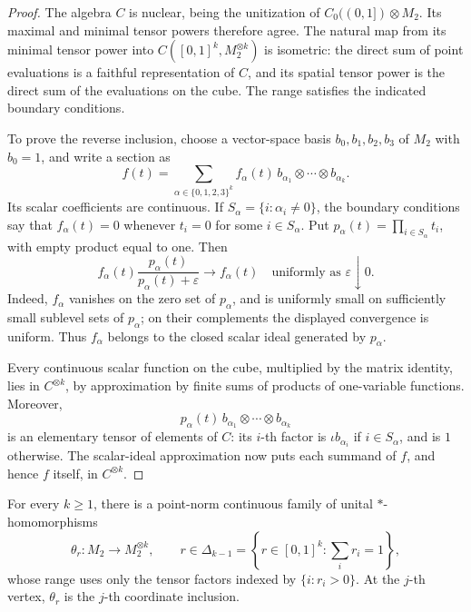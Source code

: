 \begin{proof}
The algebra \(C\) is nuclear, being the unitization of
\(C_0((0,1])\otimes M_2\). Its maximal and minimal tensor powers therefore
agree. The natural map from its minimal tensor power into
\(C([0,1]^k,M_2^{\otimes k})\) is isometric: the direct sum of point
evaluations is a faithful representation of \(C\), and its spatial
tensor power is the direct sum of the evaluations on the cube.
The range satisfies the indicated boundary conditions.

To prove the reverse inclusion, choose a vector-space basis
\(b_0,b_1,b_2,b_3\) of \(M_2\) with \(b_0=1\), and write a section as
\[
f(t)=
\sum_{\alpha\in\{0,1,2,3\}^k}
f_\alpha(t)\,
b_{\alpha_1}\otimes\cdots\otimes b_{\alpha_k}.
\]
Its scalar coefficients are continuous. If
\(S_\alpha=\{i:\alpha_i\ne0\}\), the boundary conditions say that
\(f_\alpha(t)=0\) whenever \(t_i=0\) for some \(i\in S_\alpha\).
Put \(p_\alpha(t)=\prod_{i\in S_\alpha}t_i\), with empty product equal
to one. Then
\[
f_\alpha(t)\frac{p_\alpha(t)}{p_\alpha(t)+\varepsilon}
\longrightarrow f_\alpha(t)
\quad\text{uniformly as }\varepsilon\downarrow0.
\]
Indeed, \(f_\alpha\) vanishes on the zero set of \(p_\alpha\), and is
uniformly small on sufficiently small sublevel sets of \(p_\alpha\);
on their complements the displayed convergence is uniform.
Thus \(f_\alpha\) belongs to the closed scalar ideal generated by
\(p_\alpha\).

Every continuous scalar function on the cube, multiplied by the matrix
identity, lies in \(C^{\otimes k}\), by approximation by finite sums of
products of one-variable functions. Moreover,
\[
p_\alpha(t)\,
b_{\alpha_1}\otimes\cdots\otimes b_{\alpha_k}
\]
is an elementary tensor of elements of \(C\): its \(i\)-th factor is
\(\iota b_{\alpha_i}\) if \(i\in S_\alpha\), and is \(1\) otherwise.
The scalar-ideal approximation now puts each summand of \(f\), and hence
\(f\) itself, in \(C^{\otimes k}\).
\end{proof}

\begin{lemma}\label{lem:matrix-simplex}
For every \(k\ge1\), there is a point-norm continuous family of unital
\(*\)-homomorphisms
\[
\theta_r:M_2\longrightarrow M_2^{\otimes k},
\qquad
r\in\Delta_{k-1}
=\left\{r\in[0,1]^k:\sum_i r_i=1\right\},
\]
whose range uses only the tensor factors indexed by \(\{i:r_i>0\}\).
At the \(j\)-th vertex, \(\theta_r\) is the \(j\)-th coordinate inclusion.
\end{lemma}

